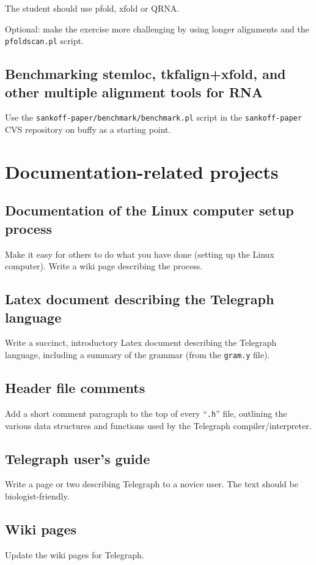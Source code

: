 \documentclass{article}
\begin{document}
The student should use pfold, xfold or QRNA.

Optional: make the exercise more challenging by using longer alignments
and the {\tt pfoldscan.pl} script.

\subsection{Benchmarking stemloc, tkfalign+xfold,
and other multiple alignment tools for RNA}

Use the {\tt sankoff-paper/benchmark/benchmark.pl} script in
the {\tt sankoff-paper} CVS repository on buffy as a starting point.

\section{Documentation-related projects}

\subsection{Documentation of the Linux computer setup process}

Make it easy for others to do what you have done (setting up the
Linux computer). Write a wiki page describing the process.

\subsection{Latex document describing the Telegraph language}

Write a succinct, introductory Latex document describing the Telegraph
language, including a summary of the grammar (from the {\tt gram.y} file).

\subsection{Header file comments}

Add a short comment paragraph to the top of every ``{\tt .h}'' file,
outlining the various data structures and functions used by the
Telegraph compiler/interpreter.

\subsection{Telegraph user's guide}

Write a page or two describing Telegraph to a novice user.
The text should be biologist-friendly.

\subsection{Wiki pages}

Update the wiki pages for Telegraph.
\end{document}
